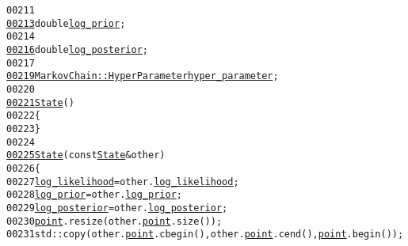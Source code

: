 \begin{footnotesize}
\begin{alltt}
00211 
\hypertarget{markov__chain_8hh_source_l00213}{}\hyperlink{structeos_1_1MarkovChain_1_1State_a4fa9205eb7785b52cc97f13714a3f62b}{00213}         \textcolor{keywordtype}{double} \hyperlink{structeos_1_1MarkovChain_1_1State_a4fa9205eb7785b52cc97f13714a3f62b}{log_prior};
00214 
\hypertarget{markov__chain_8hh_source_l00216}{}\hyperlink{structeos_1_1MarkovChain_1_1State_a893de1735354ecbfa51b34655fb28833}{00216}         \textcolor{keywordtype}{double} \hyperlink{structeos_1_1MarkovChain_1_1State_a893de1735354ecbfa51b34655fb28833}{log_posterior};
00217 
\hypertarget{markov__chain_8hh_source_l00219}{}\hyperlink{structeos_1_1MarkovChain_1_1State_a23f1f4c2b99c7b8956409f5f645d0337}{00219}         \hyperlink{structeos_1_1MarkovChain_1_1HyperParameter}{MarkovChain::HyperParameter} \hyperlink{structeos_1_1MarkovChain_1_1State_a23f1f4c2b99c7b8956409f5f645d0337}{hyper_parameter};
00220 
\hypertarget{markov__chain_8hh_source_l00221}{}\hyperlink{structeos_1_1MarkovChain_1_1State_a93beca0dcab0389f5b822394f341afc6}{00221}         \hyperlink{structeos_1_1MarkovChain_1_1State_a93beca0dcab0389f5b822394f341afc6}{State}()
00222         \{
00223         \}
00224 
\hypertarget{markov__chain_8hh_source_l00225}{}\hyperlink{structeos_1_1MarkovChain_1_1State_adaf4e7d6c9fc2b02f8adb1e924ceaf3e}{00225}         \hyperlink{structeos_1_1MarkovChain_1_1State_a93beca0dcab0389f5b822394f341afc6}{State}(\textcolor{keyword}{const} \hyperlink{structeos_1_1MarkovChain_1_1State}{State} & other)
00226         \{
00227             \hyperlink{structeos_1_1MarkovChain_1_1State_a0876fac286eb6eb52165389cfcc9e602}{log_likelihood} = other.\hyperlink{structeos_1_1MarkovChain_1_1State_a0876fac286eb6eb52165389cfcc9e602}{log_likelihood};
00228             \hyperlink{structeos_1_1MarkovChain_1_1State_a4fa9205eb7785b52cc97f13714a3f62b}{log_prior} = other.\hyperlink{structeos_1_1MarkovChain_1_1State_a4fa9205eb7785b52cc97f13714a3f62b}{log_prior};
00229             \hyperlink{structeos_1_1MarkovChain_1_1State_a893de1735354ecbfa51b34655fb28833}{log_posterior} = other.\hyperlink{structeos_1_1MarkovChain_1_1State_a893de1735354ecbfa51b34655fb28833}{log_posterior};
00230             \hyperlink{structeos_1_1MarkovChain_1_1State_a13518a1ded09d2c61dbfc2cc40297b94}{point}.resize(other.\hyperlink{structeos_1_1MarkovChain_1_1State_a13518a1ded09d2c61dbfc2cc40297b94}{point}.size());
00231             std::copy(other.\hyperlink{structeos_1_1MarkovChain_1_1State_a13518a1ded09d2c61dbfc2cc40297b94}{point}.cbegin(), other.\hyperlink{structeos_1_1MarkovChain_1_1State_a13518a1ded09d2c61dbfc2cc40297b94}{point}.cend(), \hyperlink{structeos_1_1MarkovChain_1_1State_a13518a1ded09d2c61dbfc2cc40297b94}{point}.begin());

\end{alltt}
\end{footnotesize}
